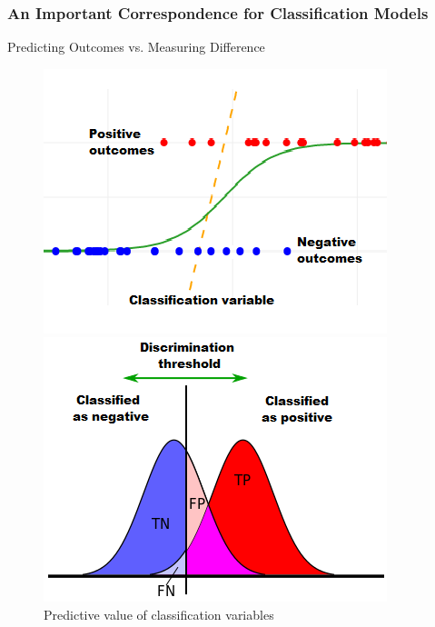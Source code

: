 \documentclass{beamer}
\begin{document}
\begin{frame}
\frametitle{An Important Correspondence for Classification Models}

%
Predicting Outcomes vs. Measuring Difference

\begin{figure}
        \begin{minipage}[b]{0.45\linewidth}
            \centering
            \includegraphics[width=\textwidth]{Figs/LogisticReg_5.png}
            \caption{Predictive value of classification variables}
        \end{minipage}
        \hspace{0.5cm}
        \begin{minipage}[b]{0.45\linewidth}
            \centering
            \includegraphics[width=\textwidth]{Figs/ROC_distns_1.png}

\end{minipage}
\end{figure}
\end{frame}
\end{document}
